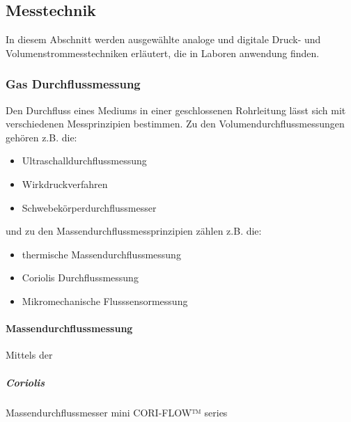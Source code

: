 \documentclass[
fontsize=12pt, 
paper=a4, 
BCOR=10mm, 
twoside=false,
 DIV=10, 
 headsepline, 
 footsepline
 ]{scrartcl}
\begin{document}
%
\subsection{Messtechnik}



In diesem Abschnitt werden ausgewählte analoge und digitale Druck- und Volumenstrommesstechniken erläutert, die in Laboren anwendung finden.

\subsubsection{Gas Durchflussmessung}

Den Durchfluss eines Mediums in einer geschlossenen Rohrleitung lässt sich mit verschiedenen Messprinzipien bestimmen. Zu den Volumendurchflussmessungen gehören z.B. die:

\begin{itemize}
\item Ultraschalldurchflussmessung
\item Wirkdruckverfahren
\item Schwebekörperdurchflussmesser
\end{itemize}

und zu den Massendurchflussmessprinzipien zählen z.B. die:

\begin{itemize}
\item thermische Massendurchflussmessung
\item Coriolis Durchflussmessung
\item Mikromechanische Flusssensormessung
\end{itemize}




\paragraph{Massendurchflussmessung}

Mittels der 

\subparagraph{Coriolis}

Massendurchflussmesser mini CORI-FLOW™ series
\end{document}
